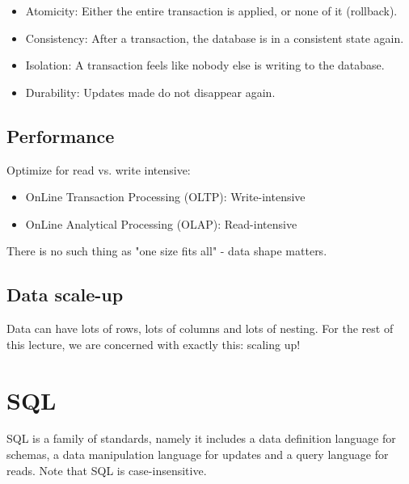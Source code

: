 \documentclass[11pt,oneside,a4paper]{article}
\begin{document}
\vspace{-\topsep}
\begin{itemize}
	\setlength{\itemsep}{0pt}
	\setlength{\parskip}{0pt}
	\item Atomicity: Either the entire transaction is applied, or none of it (rollback).
	\item Consistency: After a transaction, the database is in a consistent state again.
	\item Isolation: A transaction feels like nobody else is writing to the database.
	\item Durability: Updates made do not disappear again.
\end{itemize}
\vspace{-\topsep}

\subsection{Performance}

Optimize for read vs. write intensive:
\vspace{-\topsep}
\begin{itemize}
	\setlength{\itemsep}{0pt}
	\setlength{\parskip}{0pt}
	\item OnLine Transaction Processing	(OLTP):	Write-intensive
	\item OnLine Analytical Processing (OLAP): Read-intensive
\end{itemize}

There is no such thing as "one size fits all" - data shape matters.

\subsection{Data scale-up}

Data can have lots of rows, lots of columns and lots of nesting. For the rest of this lecture, we are concerned with exactly this: scaling up!

\newpage

\titlespacing{\subsection}{0pt}{0ex}{0ex}

\section{SQL}

SQL is a family of standards, namely it includes a data definition language for schemas, a data manipulation language for updates and a query language for reads. Note that SQL is case-insensitive.
\end{document}
